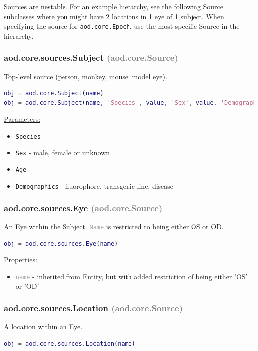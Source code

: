 \documentclass[10pt]{exam}
\newcommand\aodparam[1]{\textcolor{codepurple}{\texttt{#1}}}
\newcommand\aodclass[1]{\textcolor{codeblue}{\texttt{#1}}}
\newcommand\aodprop[1]{\textcolor{darkgray}{\texttt{#1}}}
\newcommand\docheader[1]{\vspace{0.6ex}\noindent\underline{#1}\vspace{0.15ex}}
\begin{document}
		\noindent Sources are nestable. For an example hierarchy, see the following Source subclasses where you might have 2 locations in 1 eye of 1 subject. 
		When specifying the source for \aodclass{aod.core.Epoch}, use the most specific Source in the hierarchy.
		\subsubsection{aod.core.sources.Subject \textcolor{gray}{(aod.core.Source)}}
			\noindent Top-level source (person, monkey, mouse, model eye).
			\begin{lstlisting}[language=matlab]
obj = aod.core.Subject(name)
obj = aod.core.Subject(name, 'Species', value, 'Sex', value, 'Demographics', value)
			\end{lstlisting}
			\docheader{Parameters:}
			\begin{itemize}
				\item \aodparam{Species}
				\item \aodparam{Sex} - male, female or unknown
				\item \aodparam{Age}
				\item \aodparam{Demographics} - fluorophore, transgenic line, disease
			\end{itemize}
		\subsubsection{aod.core.sources.Eye \textcolor{gray}{(aod.core.Source)}}
			\noindent An Eye within the Subject. \aodprop{Name} is restricted to being either OS or OD.
			\begin{lstlisting}[language=matlab]
obj = aod.core.sources.Eye(name)
			\end{lstlisting} 
			\docheader{Properties:}
			\begin{itemize}
				\item \aodprop{name} - inherited from Entity, but with added restriction of being either 'OS' or 'OD'
			\end{itemize}
			
		\subsubsection{aod.core.sources.Location  	\textcolor{gray}{(aod.core.Source)}}
			\noindent A location within an Eye.
			\begin{lstlisting}[language=matlab]
obj = aod.core.sources.Location(name)
			\end{lstlisting}
	
\end{document}

